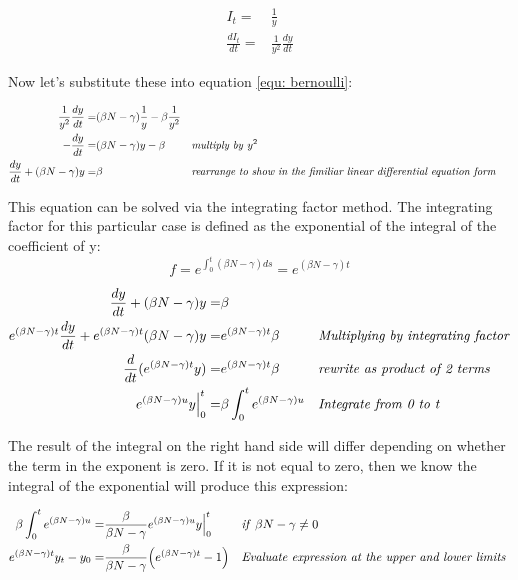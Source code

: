 \documentclass[fontsize=17pt]{article}
\begin{document}
\begin{align}
\label{equ: I} I_{t}=&\frac{1}{y}\\ 
\frac{dI_{t}}{dt}=&\frac{1}{y^{2}}\frac{dy}{dt}
\end{align}

Now let's substitute these into equation \ref{equ: bernoulli}:

 \begin{align}
\frac{1}{y^{2}}\frac{dy}{dt}=&(\beta N-\gamma)\frac{1}{y}-\beta \frac{1}{y^{2}}\\
-\frac{dy}{dt}=&(\beta N-\gamma)y-\beta&& \text{\textit{multiply by }}y^{2}\\
\frac{dy}{dt}+(\beta N-\gamma)y=&\beta&& \text{\textit{rearrange to show in the fimiliar linear differential equation form }}
\end{align}

This equation can be solved via the integrating factor method. The integrating factor for this particular case is defined as the exponential of the integral of the coefficient of y:
\begin{equation}
f=e^{\int_{0}^{t}(\beta N -\gamma)ds}= e^{(\beta N- \gamma)t}
\end{equation}

 \begin{align}
\frac{dy}{dt}+(\beta N-\gamma)y=&\beta&&\\
e^{(\beta N- \gamma)t}\frac{dy}{dt}+e^{(\beta N- \gamma)t}(\beta N-\gamma)y=&e^{(\beta N- \gamma)t}\beta&& \text{\textit{Multiplying by integrating factor}}\\
\frac{d}{dt}(e^{(\beta N- \gamma)t}y)=&e^{(\beta N- \gamma)t}\beta&& \text{\textit{rewrite as product of 2 terms}}\\
e^{(\beta N- \gamma)u}y\Big|_0^t=&\beta \int_{0}^{t}e^{(\beta N- \gamma)u}&& \text{\textit{Integrate from 0 to t}}
\end{align}

The result of the integral on the right hand side will differ depending on whether the term in the exponent is zero. If it is not equal to zero, then we know the integral of the exponential will produce this expression:

 \begin{align}
\beta \int_{0}^{t}e^{(\beta N- \gamma)u}=&\frac{\beta}{\beta N-\gamma}e^{(\beta N- \gamma)u}y\Big|_0^t&& \text{\textit{if} }\beta N-\gamma \neq 0\\
e^{(\beta N- \gamma)t}y_{t}-y_{0}=&\frac{\beta}{\beta N-\gamma}\Big(e^{(\beta N- \gamma)t}-1\Big)&& \text{\textit{Evaluate expression at the upper and lower limits} }
\end{align}
\end{document}
